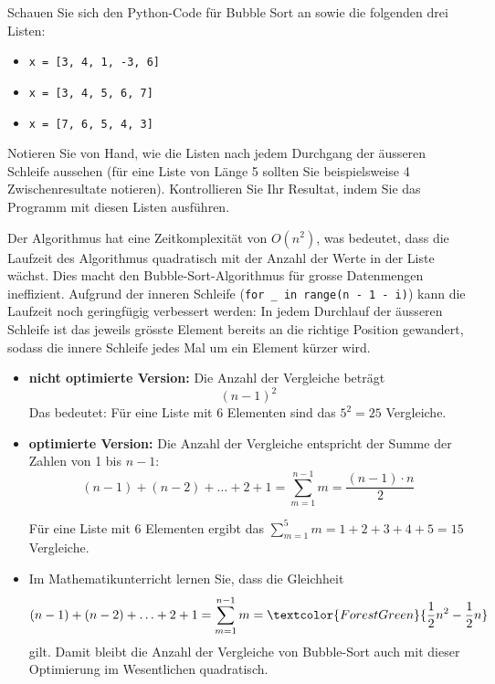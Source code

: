 
\begin{myexercise}
	Schauen Sie sich den Python-Code für Bubble Sort an sowie die folgenden drei Listen:
	\begin{itemize}
		\item \lstinline|x = [3, 4, 1, -3, 6]|
		\item \lstinline|x = [3, 4, 5, 6, 7]| %
		\item \lstinline|x = [7, 6, 5, 4, 3]|
	\end{itemize}
	Notieren Sie von Hand, wie die Listen nach jedem Durchgang der äusseren Schleife aussehen (für eine Liste von Länge 5 sollten Sie beispielsweise 4 Zwischenresultate notieren). Kontrollieren Sie Ihr Resultat, indem Sie das Programm mit diesen Listen ausführen.
	\begin{myanswer}
		
	\end{myanswer}
\end{myexercise}

Der Algorithmus hat eine Zeitkomplexität von $O(n^2)$, was bedeutet, dass die Laufzeit des Algorithmus quadratisch mit der Anzahl der Werte in der Liste wächst. Dies macht den Bubble-Sort-Algorithmus für grosse Datenmengen ineffizient. Aufgrund der inneren Schleife (\lstinline|for _ in range(n - 1 - i)|) kann die Laufzeit noch geringfügig verbessert werden: In jedem Durchlauf der äusseren Schleife ist das jeweils grösste Element bereits an die richtige Position gewandert, sodass die innere Schleife jedes Mal um ein Element kürzer wird.

\begin{itemize}
	\item \textbf{nicht optimierte Version:} Die Anzahl der Vergleiche beträgt \[(n-1)^2\]
	      Das bedeutet: Für eine Liste mit 6 Elementen sind das $5^2 = 25$ Vergleiche.
	\item \textbf{optimierte Version:} Die Anzahl der Vergleiche entspricht der Summe der Zahlen von 1 bis $n-1$:
	      \[
		      (n-1) + (n-2) + \ldots + 2 + 1 = \displaystyle\sum_{m=1}^{n-1} m = \frac{(n-1) \cdot n}{2}
	      \]

	      Für eine Liste mit 6 Elementen ergibt das $\displaystyle\sum_{m=1}^{5} m = 1 + 2 + 3 + 4 + 5 = 15$ Vergleiche.
	\item Im Mathematikunterricht lernen Sie, dass die Gleichheit
	      \[
		      (n-1) + (n-2) + \ldots + 2 + 1 = \displaystyle\sum_{m=1}^{n-1} m = \textcolor{ForestGreen}{\frac{1}{2}n^2 - \frac{1}{2}n}
	      \]
	      gilt. Damit bleibt die Anzahl der Vergleiche von Bubble-Sort auch mit dieser Optimierung im Wesentlichen quadratisch.
\end{itemize}

